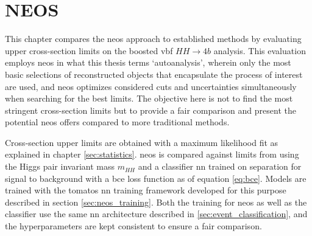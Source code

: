 \chapter{NEOS}















This chapter compares the \ac{neos} approach to established methods by evaluating upper cross-section limits on the boosted \ac{vbf} $HH\rightarrow4b$ analysis. This evaluation employs \ac{neos} in what this thesis terms `autoanalysis', wherein only the most basic selections of reconstructed objects that encapsulate the process of interest are used, and \ac{neos} optimizes considered cuts and uncertainties simultaneously when searching for the best limits. The objective here is not to find the most stringent cross-section limits but to provide a fair comparison and present the potential \ac{neos} offers compared to more traditional methods.

Cross-section upper limits are obtained with a maximum likelihood fit as explained in chapter \ref{sec:statistics}. \ac{neos} is compared against limits from using the Higgs pair invariant mass $m_{HH}$ and a classifier \ac{nn} trained on separation for signal to background with a \ac{bce} loss function as of equation \ref{eq:bce}. Models are trained with the \ac{tomatos} \ac{nn} training framework developed for this purpose \citep{tomatos} described in section \ref{sec:neos_training}. Both the training for \ac{neos} as well as the classifier use the same \ac{nn} architecture described in \ref{sec:event_classification}, and the hyperparameters are kept consistent to ensure a fair comparison.

